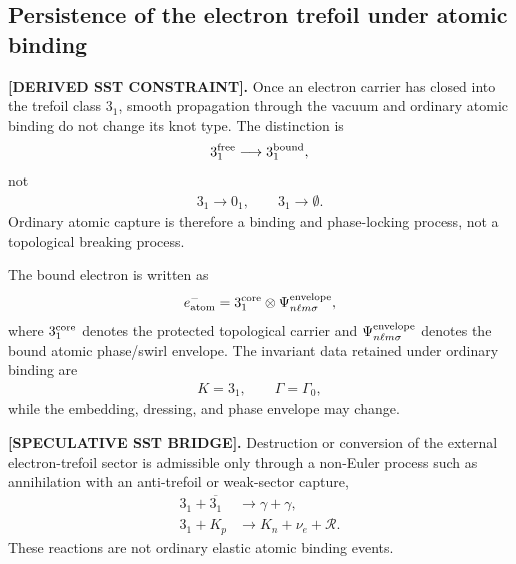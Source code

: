 
    \subsection{Persistence of the electron trefoil under atomic binding}
        \label{subsec:electron_trefoil_persistence_atomic_binding}

        \textbf{[DERIVED SST CONSTRAINT].}
        Once an electron carrier has closed into the trefoil class \(3_1\),
        smooth propagation through the vacuum and ordinary atomic binding do not
        change its knot type. The distinction is
        \begin{align}
            3_1^{\rm free}
            \longrightarrow
            3_1^{\rm bound},
            \label{eq:free_to_bound_trefoil}
        \end{align}
        not
        \begin{align}
            3_1 \longrightarrow 0_1,
            \qquad
            3_1 \longrightarrow \emptyset .
        \end{align}
        Ordinary atomic capture is therefore a binding and phase-locking process,
        not a topological breaking process.

        The bound electron is written as
        \begin{align}
            e^-_{\rm atom}
            =
            3_1^{\rm core}
            \otimes
            \Psi_{n\ell m\sigma}^{\rm envelope},
            \label{eq:bound_electron_core_envelope}
        \end{align}
        where \(3_1^{\rm core}\) denotes the protected topological carrier and
        \(\Psi_{n\ell m\sigma}^{\rm envelope}\) denotes the bound atomic
        phase/swirl envelope. The invariant data retained under ordinary binding are
        \begin{align}
            K=3_1,
            \qquad
            \Gamma=\Gamma_0,
        \end{align}
        while the embedding, dressing, and phase envelope may change.

        \textbf{[SPECULATIVE SST BRIDGE].}
        Destruction or conversion of the external electron-trefoil sector is
        admissible only through a non-Euler process such as annihilation with an
        anti-trefoil or weak-sector capture,
        \begin{align}
            3_1+\overline{3_1} &\longrightarrow \gamma+\gamma,\\
            3_1+K_p &\longrightarrow K_n+\nu_e+\mathcal{R}.
            \label{eq:trefoil_conversion_bridges}
        \end{align}
        These reactions are not ordinary elastic atomic binding events.
